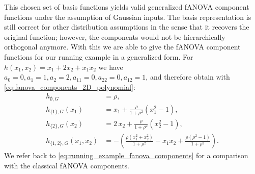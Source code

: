 This chosen set of basis functions yields valid generalized fANOVA component functions under the assumption of Gaussian inputs. The basis representation is still correct for other distribution assumptions in the sense that it recovers the original function; however, the components would not be hierarchically orthogonal anymore.
With this we are able to give the fANOVA component functions for our running example in a generalized form. For $h(x_1,x_2) = x_1 + 2x_2 + x_1 x_2$  we have $a_0 = 0, a_1 = 1, a_2 = 2, a_{11} = 0, a_{22} = 0, a_{12} = 1$, and therefore obtain with \autoref{eq:fanova_components_2D_polynomial}:
\begin{align*}
h_{\emptyset, G} &= \rho, \\[0.5em]
h_{\{1\}, G}(x_1) &= x_1 + \frac{\rho}{1+\rho^2}(x_1^2 - 1), \\[0.5em]
h_{\{2\}, G}(x_2) &= 2\,x_2 + \frac{\rho}{1+\rho^2}(x_2^2 - 1), \\[0.5em]
h_{\{1,2\}, G}(x_1,x_2) 
&= -\left(\frac{\rho(x_1^2+x_2^2)}{1+\rho^2} - x_1 x_2 + \frac{\rho(\rho^2-1)}{1+\rho^2}\right).
\end{align*}
We refer back to \autoref{eq:running_example_fanova_components} for a comparison with the classical fANOVA components.



